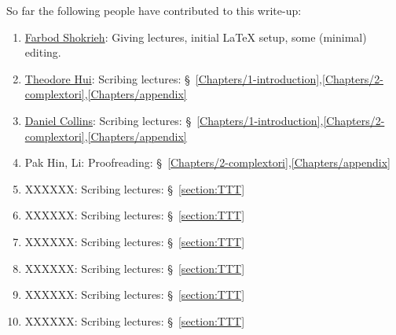 



\vspace{+.5cm}

So far the following people have contributed to this write-up:
\begin{enumerate}
\item \href{http://www.math.cornell.edu/~farbod}{Farbod Shokrieh}: Giving lectures, initial LaTeX setup, some (minimal) editing.
\item \href{http://www.math.cornell.edu/m/People/bynetid/hh535}{Theodore Hui}: Scribing lectures: \S~\ref{Chapters/1-introduction},\ref{Chapters/2-complextori},\ref{Chapters/appendix}
\item \href{https://www.math.cornell.edu/m/People/bynetid/djc224}{Daniel Collins}: Scribing lectures: \S~\ref{Chapters/1-introduction},\ref{Chapters/2-complextori},\ref{Chapters/appendix}
\item Pak Hin, Li: Proofreading: \S~\ref{Chapters/2-complextori},\ref{Chapters/appendix}
\item XXXXXX: Scribing lectures: \S~\ref{section:TTT}
\item XXXXXX: Scribing lectures: \S~\ref{section:TTT}
\item XXXXXX: Scribing lectures: \S~\ref{section:TTT}
\item XXXXXX: Scribing lectures: \S~\ref{section:TTT}
\item XXXXXX: Scribing lectures: \S~\ref{section:TTT}
\item XXXXXX: Scribing lectures: \S~\ref{section:TTT}
\end{enumerate}



